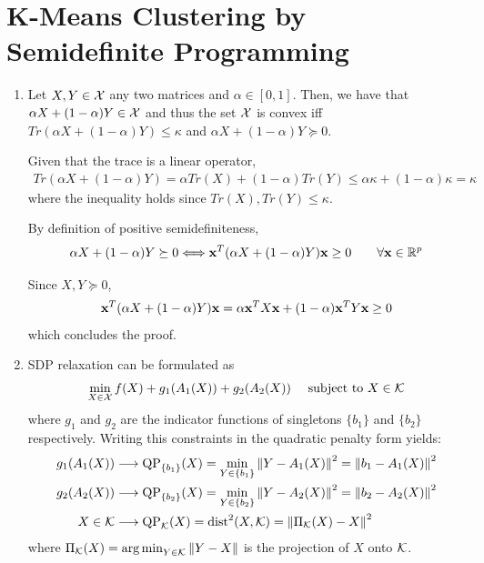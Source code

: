 \documentclass{article}
\begin{document}
\section{K-Means Clustering by Semidefinite Programming}
\begin{enumerate}[label=(\alph*)]
    \item
    Let $X, Y \in \mathcal{X}$ any two matrices and $\alpha \in [0,1]$. Then, we have that $\alpha X + (1-\alpha)Y \in \mathcal{X}$ and thus the set $\mathcal{X}$ is convex iff $Tr(\alpha X + (1-\alpha)Y)\leq \kappa$ and $\alpha X + (1-\alpha)Y \succeq 0$.
    
    Given that the trace is a linear operator,
    \begin{align}
        Tr(\alpha X + (1-\alpha)Y) = \alpha Tr(X) + (1-\alpha)Tr(Y) \leq \alpha \kappa + (1-\alpha) \kappa = \kappa
    \end{align}
    where the inequality holds since $Tr(X),Tr(Y)\leq \kappa$.
    
    By definition of positive semidefiniteness,
    \begin{align}
        \alpha X + (1-\alpha)Y \succeq 0 \Longleftrightarrow \mathbf{x}^T(\alpha X + (1-\alpha)Y) \mathbf{x} \geq 0\qquad \forall \mathbf{x}\in \mathbb{R}^p
    \end{align}
    
    Since $X,Y\succeq 0$,
    \begin{align}
        \mathbf{x}^T(\alpha X + (1-\alpha)Y) \mathbf{x} = \alpha \mathbf{x}^T X \mathbf{x} + (1-\alpha)\mathbf{x}^T Y\mathbf{x}  \geq 0
    \end{align}
    which concludes the proof.
    
    \item SDP relaxation can be formulated as
    \begin{align}
        \min_{X\in \mathcal{X}} f(X) + g_1(A_1(X))+g_2(A_2(X)) \quad \text{ subject to }X\in \mathcal{K}
    \end{align}
    where $g_1$ and $g_2$ are the indicator functions of singletons $\{b_1\}$ and $\{b_2\}$ respectively. Writing this constraints in the quadratic penalty form yields:
    \begin{align}
        g_1(A_1(X)) &\longrightarrow \text{QP}_{\{b_1\}}(X)=\min_{Y\in \{b_1\}}\left\lVert Y-A_1(X)\right\rVert^2=\left\lVert b_1-A_1(X)\right\rVert^2 \\
        g_2(A_2(X)) &\longrightarrow \text{QP}_{\{b_2\}}(X)=\min_{Y\in \{b_2\}}\left\lVert Y-A_2(X)\right\rVert^2=\left\lVert b_2-A_2(X)\right\rVert^2 \\
        X\in \mathcal{K} &\longrightarrow \text{QP}_{\mathcal{K}}(X)=\text{dist}^2(X,\mathcal{K})=\left\lVert\Pi_{\mathcal{K}}(X) - X\right\rVert^2
    \end{align}
    where $\Pi_{\mathcal{K}}(X) = \operatorname*{arg\,min}_{Y\in \mathcal{K}}\left\lVert Y-X\right\rVert$ is the projection of $X$ onto $\mathcal{K}$.
    

\end{enumerate}
\end{document}
